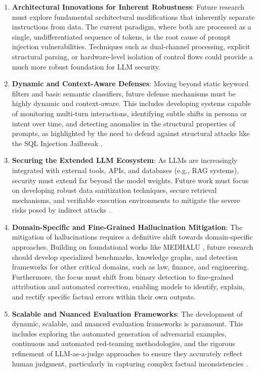 \documentclass[11pt,a4paper]{article}
\begin{document}
\begin{enumerate}
  \item \textbf{Architectural Innovations for Inherent Robustness}: Future research must explore fundamental architectural modifications that inherently separate instructions from data. The current paradigm, where both are processed as a single, undifferentiated sequence of tokens, is the root cause of prompt injection vulnerabilities. Techniques such as dual-channel processing, explicit structural parsing, or hardware-level isolation of control flows could provide a much more robust foundation for LLM security.
  \item \textbf{Dynamic and Context-Aware Defenses}: Moving beyond static keyword filters and basic semantic classifiers, future defense mechanisms must be highly dynamic and context-aware. This includes developing systems capable of monitoring multi-turn interactions, identifying subtle shifts in persona or intent over time, and detecting anomalies in the structural properties of prompts, as highlighted by the need to defend against structural attacks like the SQL Injection Jailbreak \cite{Zhao_2024_SQL}.
  \item \textbf{Securing the Extended LLM Ecosystem}: As LLMs are increasingly integrated with external tools, APIs, and databases (e.g., RAG systems), security must extend far beyond the model weights. Future work must focus on developing robust data sanitization techniques, secure retrieval mechanisms, and verifiable execution environments to mitigate the severe risks posed by indirect attacks \cite{Wang_2024_LLMs}.
  \item \textbf{Domain-Specific and Fine-Grained Hallucination Mitigation}: The mitigation of hallucinations requires a definitive shift towards domain-specific approaches. Building on foundational works like MEDHALU \cite{Agarwal_2024_Medhalu}, future research should develop specialized benchmarks, knowledge graphs, and detection frameworks for other critical domains, such as law, finance, and engineering. Furthermore, the focus must shift from binary detection to fine-grained attribution and automated correction, enabling models to identify, explain, and rectify specific factual errors within their own outputs.
  \item \textbf{Scalable and Nuanced Evaluation Frameworks}: The development of dynamic, scalable, and nuanced evaluation frameworks is paramount. This includes exploring the automated generation of adversarial examples, continuous and automated red-teaming methodologies, and the rigorous refinement of LLM-as-a-judge approaches to ensure they accurately reflect human judgment, particularly in capturing complex factual inconsistencies \cite{Peisakhovsky_2025_LLMs}.

\end{enumerate}
\end{document}
